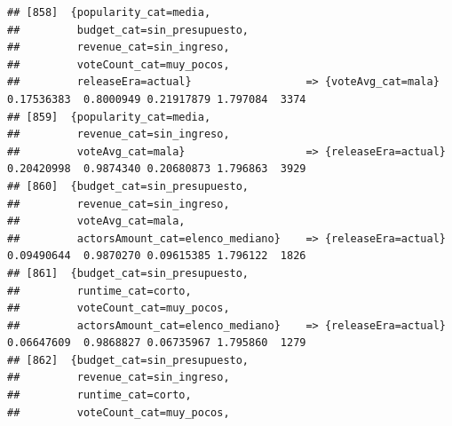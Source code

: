 \documentclass[
]{article}
\begin{document}
\begin{verbatim}
## [858]  {popularity_cat=media,                                                                                                   
##         budget_cat=sin_presupuesto,                                                                                             
##         revenue_cat=sin_ingreso,                                                                                                
##         voteCount_cat=muy_pocos,                                                                                                
##         releaseEra=actual}                  => {voteAvg_cat=mala}                0.17536383  0.8000949 0.21917879 1.797084  3374
## [859]  {popularity_cat=media,                                                                                                   
##         revenue_cat=sin_ingreso,                                                                                                
##         voteAvg_cat=mala}                   => {releaseEra=actual}               0.20420998  0.9874340 0.20680873 1.796863  3929
## [860]  {budget_cat=sin_presupuesto,                                                                                             
##         revenue_cat=sin_ingreso,                                                                                                
##         voteAvg_cat=mala,                                                                                                       
##         actorsAmount_cat=elenco_mediano}    => {releaseEra=actual}               0.09490644  0.9870270 0.09615385 1.796122  1826
## [861]  {budget_cat=sin_presupuesto,                                                                                             
##         runtime_cat=corto,                                                                                                      
##         voteCount_cat=muy_pocos,                                                                                                
##         actorsAmount_cat=elenco_mediano}    => {releaseEra=actual}               0.06647609  0.9868827 0.06735967 1.795860  1279
## [862]  {budget_cat=sin_presupuesto,                                                                                             
##         revenue_cat=sin_ingreso,                                                                                                
##         runtime_cat=corto,                                                                                                      
##         voteCount_cat=muy_pocos,                                                                                                

\end{verbatim}
\end{document}
